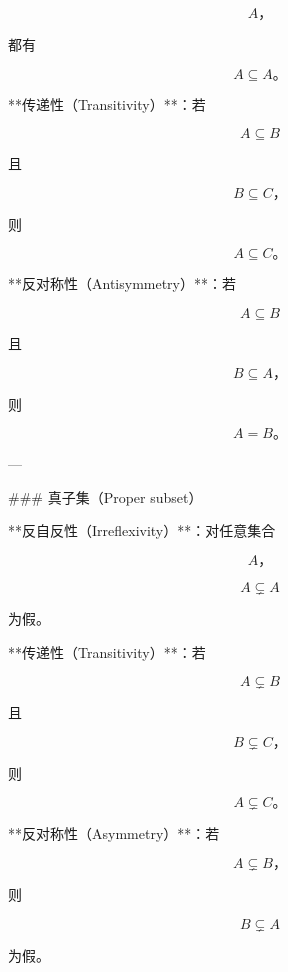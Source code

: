 $$
A，
$$

都有

$$
A \subseteq A。
$$

**传递性（Transitivity）**：若

$$
A \subseteq B
$$

且

$$
B \subseteq C，
$$

则

$$
A \subseteq C。
$$

**反对称性（Antisymmetry）**：若

$$
A \subseteq B
$$

且

$$
B \subseteq A，
$$

则

$$
A = B。
$$

---

### 真子集（Proper subset）

**反自反性（Irreflexivity）**：对任意集合

$$
A，
$$

$$
A \subsetneq A
$$

为假。

**传递性（Transitivity）**：若

$$
A \subsetneq B
$$

且

$$
B \subsetneq C，
$$

则

$$
A \subsetneq C。
$$

**反对称性（Asymmetry）**：若

$$
A \subsetneq B，
$$

则

$$
B \subsetneq A
$$

为假。
